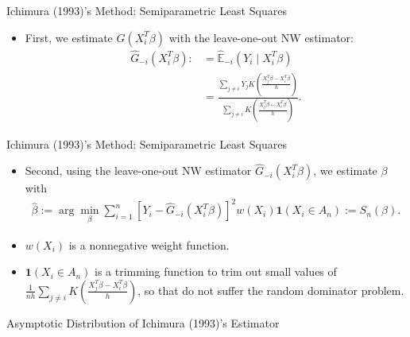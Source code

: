 \documentclass[xcolor=svgnames,dvipdfmx,cjk]{beamer}
\theoremstyle{example}
\begin{document}
\begin{frame}{Ichimura (1993)'s Method: Semiparametric Least Squares}
  \begin{itemize}
  \item First, we estimate $G(X_i^{T}\beta)$  
        with the leave-one-out NW estimator:
        \begin{align*}
          \hat{G}_{-i}(X_i^{T}\beta) 
              :&= \hat{\mathbb{E}}_{-i}(Y_i \mid X_i^{T} \beta) \\
               &= \frac
                  {\sum_{j \neq i} Y_j 
                   K \left( \frac
                            {X_j^{T}\beta - X_i^{T}\beta}
                            {h} 
                     \right) 
                  }
                  {\sum_{j \neq i} 
                   K \left( \frac
                           {X_j^{T}\beta - X_i^{T}\beta}
                           {h} 
                     \right) 
                  }.
        \end{align*}
\end{itemize}
\end{frame}

\begin{frame}{Ichimura (1993)'s Method: Semiparametric Least Squares}
  \begin{itemize}
    \item Second, 
          using the leave-one-out NW estimator $\hat{G}_{-i}(X_i^{T}\beta)$,
          we estimate $\beta$ with
          \begin{align*}
            \hat{\beta} 
              := \arg \min_{\beta} 
                    \sum_{i=1}^{n}  
                          \left[ Y_i - \hat{G}_{-i}(X_i^{T}\beta) \right]^2 
                          w(X_i) \mathbf{1}(X_i \in A_n) := S_n(\beta).
          \end{align*}
    \item  $w(X_i)$ is a nonnegative weight function.
    \item  $\mathbf{1}(X_i \in A_n)$ is a trimming function to trim out small values of 
           $\frac{1}{nh} \sum_{j \neq i} 
              K \left( \frac
                       {X_j^{T}\beta - X_i^{T}\beta}
                       {h} 
                \right) $,
           so that do not suffer the random dominator problem. 
  \end{itemize}
\end{frame}


\begin{frame}{Asymptotic Distribution of Ichimura (1993)'s Estimator}
  
\end{frame}
\end{document}
